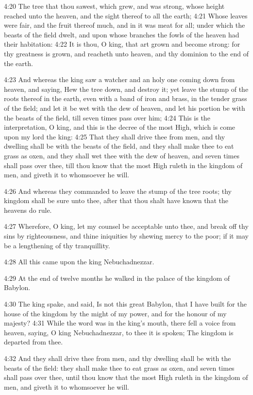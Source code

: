 4:20 The tree that thou sawest, which grew, and was strong, whose height reached unto the heaven, and the sight thereof to all the earth; 4:21 Whose leaves were fair, and the fruit thereof much, and in it was meat for all; under which the beasts of the field dwelt, and upon whose branches the fowls of the heaven had their habitation: 4:22 It is thou, O king, that art grown and become strong: for thy greatness is grown, and reacheth unto heaven, and thy dominion to the end of the earth.

4:23 And whereas the king saw a watcher and an holy one coming down from heaven, and saying, Hew the tree down, and destroy it; yet leave the stump of the roots thereof in the earth, even with a band of iron and brass, in the tender grass of the field; and let it be wet with the dew of heaven, and let his portion be with the beasts of the field, till seven times pass over him; 4:24 This is the interpretation, O king, and this is the decree of the most High, which is come upon my lord the king: 4:25 That they shall drive thee from men, and thy dwelling shall be with the beasts of the field, and they shall make thee to eat grass as oxen, and they shall wet thee with the dew of heaven, and seven times shall pass over thee, till thou know that the most High ruleth in the kingdom of men, and giveth it to whomsoever he will.

4:26 And whereas they commanded to leave the stump of the tree roots; thy kingdom shall be sure unto thee, after that thou shalt have known that the heavens do rule.

4:27 Wherefore, O king, let my counsel be acceptable unto thee, and break off thy sins by righteousness, and thine iniquities by shewing mercy to the poor; if it may be a lengthening of thy tranquillity.

4:28 All this came upon the king Nebuchadnezzar.

4:29 At the end of twelve months he walked in the palace of the kingdom of Babylon.

4:30 The king spake, and said, Is not this great Babylon, that I have built for the house of the kingdom by the might of my power, and for the honour of my majesty?  4:31 While the word was in the king's mouth, there fell a voice from heaven, saying, O king Nebuchadnezzar, to thee it is spoken; The kingdom is departed from thee.

4:32 And they shall drive thee from men, and thy dwelling shall be with the beasts of the field: they shall make thee to eat grass as oxen, and seven times shall pass over thee, until thou know that the most High ruleth in the kingdom of men, and giveth it to whomsoever he will.


